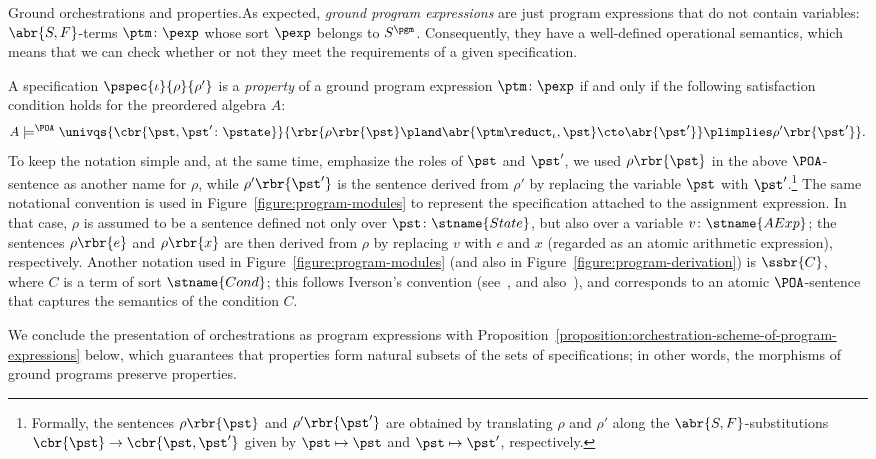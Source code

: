 \documentclass{LMCS}
\begin{document}
\begin{minisection}{Ground orchestrations and properties.}As expected, \emph{ground program expressions} are just program expressions that do not contain variables: \(\abr{S, F}\)\nb-terms \(\ptm \colon \pexp\) whose sort \(\pexp\) belongs to \(S^{\pgm}\).
  Consequently, they have a well-defined operational semantics, which means that we can check whether or not they meet the requirements of a given specification.

  A specification \(\pspec{\iota}{\rho}{\rho'}\) is a \emph{property} of a ground program expression \(\ptm \colon \pexp\) if and only if the following satisfaction condition holds for the preordered algebra \(A\):
  \[
  A \models^{\POA} \univqs{\cbr{\pst, \pst' \colon \pstate}}{\rbr{\rho\rbr{\pst} \pland \abr{\ptm \reduct_{\iota}, \pst} \cto \abr{\pst'}} \plimplies \rho'\rbr{\pst'}}.
  \]
  To keep the notation simple and, at the same time, emphasize the roles of \(\pst\) and \(\pst'\), we used \(\rho\rbr{\pst}\) in the above \(\POA\)\nb-sentence as another name for \(\rho\), while \(\rho'\rbr{\pst'}\) is the sentence derived from \(\rho'\) by replacing the variable \(\pst\) with \(\pst'\).\footnote{Formally, the sentences \(\rho\rbr{\pst}\) and \(\rho'\rbr{\pst'}\) are obtained by translating \(\rho\) and \(\rho'\) along the \(\abr{S, F}\)\nb-substitutions \(\cbr{\pst} \to \cbr{\pst, \pst'}\) given by \(\pst \mapsto \pst\) and \(\pst \mapsto \pst'\), respectively.}
  The same notational convention is used in Figure~\ref{figure:program-modules} to represent the specification attached to the assignment expression.  In that case, \(\rho\) is assumed to be a sentence defined not only over \(\pst \colon \stname{State}\), but also over a variable \(v \colon \stname{AExp}\); the sentences \(\rho\rbr{e}\) and \(\rho\rbr{x}\) are then derived from \(\rho\) by replacing \(v\) with \(e\) and \(x\) (regarded as an atomic arithmetic expression), respectively.
  Another notation used in Figure~\ref{figure:program-modules} (and also in Figure~\ref{figure:program-derivation}) is \(\ssbr{C}\), where \(C\) is a term of sort \(\stname{Cond}\); this follows Iverson's convention (see~\cite{Iverson:A-Programming-Language-1962}, and also~\cite{Graham-Knuth-Patashnik:Concrete-Mathematics-1994}), and corresponds to an atomic \(\POA\)\nb-sentence that captures the semantics of the condition \(C\).
  
  We conclude the presentation of orchestrations as program expressions with Proposition~\ref{proposition:orchestration-scheme-of-program-expressions} below, which guarantees that properties form natural subsets of the sets of specifications; in other words, the morphisms of ground programs preserve properties.
  


\end{minisection}
\end{document}
